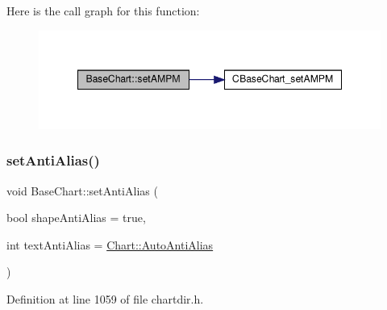 Here is the call graph for this function\+:
\nopagebreak
\begin{figure}[H]
\begin{center}
\leavevmode
\includegraphics[width=348pt]{class_base_chart_a41ba33ec1d9c3dd835653dc63571f2bf_cgraph}
\end{center}
\end{figure}
\mbox{\label{class_base_chart_a04c6e9606f39ad2dfbabb7d3d6b147e6}} 
\subsubsection{\texorpdfstring{set\+Anti\+Alias()}{setAntiAlias()}}
{\footnotesize\ttfamily void Base\+Chart\+::set\+Anti\+Alias (\begin{DoxyParamCaption}\item[{bool}]{shape\+Anti\+Alias = {\ttfamily true},  }\item[{int}]{text\+Anti\+Alias = {\ttfamily \hyperlink{namespace_chart_a07883b6d552537a99c7dab3bdc641d2ba793ff02fc6d46a7d5ebcbac29e111a3f}{Chart\+::\+Auto\+Anti\+Alias}} }\end{DoxyParamCaption})\hspace{0.3cm}{\ttfamily [inline]}}



Definition at line 1059 of file chartdir.\+h.


